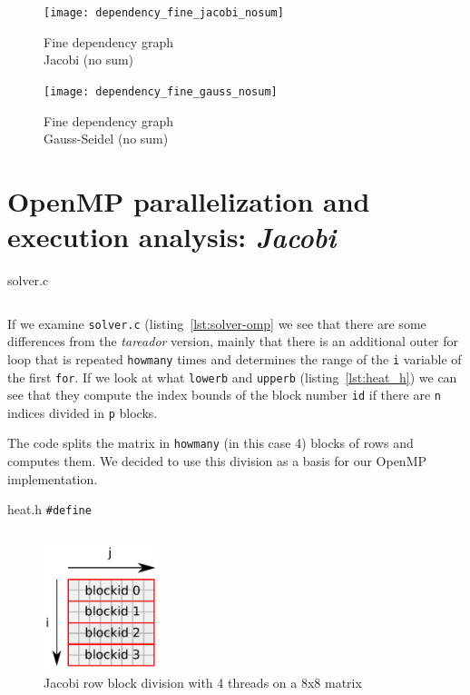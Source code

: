 \begin{figure}[H]
    \begin{minipage}{0.5\textwidth}
        \centering
        \texttt{[image: dependency\_fine\_jacobi\_nosum]}
        \caption{Fine dependency graph \\ Jacobi (no sum)}%
        \label{fig:dependency_fine_jacobi_nosum}
    \end{minipage}
    \begin{minipage}{0.5\textwidth}
        \centering
        \texttt{[image: dependency\_fine\_gauss\_nosum]}
        \caption{Fine dependency graph \\ Gauss-Seidel (no sum)}%
        \label{fig:dependency_fine_gauss_nosum}
    \end{minipage}
\end{figure}

\pagebreak
\section{OpenMP parallelization and execution analysis: \emph{Jacobi}}

\begin{listing}[H]
    \caption{solver.c}%
    \label{lst:solver-omp}
    \inputminted[firstline=17,lastline=39]{c}{code/solver-omp-orig.c}
\end{listing}

If we examine \texttt{solver.c} (listing~\ref{lst:solver-omp} we see that there are some differences 
from the \emph{tareador} version,
mainly that there is an additional outer for loop that is repeated \texttt{howmany} times and determines the
range of the \texttt{i} variable of the first \texttt{for}. If we look at what \texttt{lowerb} and
\texttt{upperb} (listing~\ref{lst:heat_h}) we can see that they compute the index bounds of the block
number \texttt{id} if there are \texttt{n} indices divided in \texttt{p} blocks.

The code splits the matrix in \texttt{howmany} (in this case 4) blocks of rows and computes them.
We decided to use this division as a basis for our OpenMP implementation.

\begin{listing}[H]
    \caption{heat.h \texttt{\#define}}%
    \label{lst:heat_h}
    \inputminted[firstline=59,lastline=61]{c}{code/heat.h}
\end{listing}


\begin{figure}[H]
    \centering
    \includegraphics[width=0.3\textwidth]{jacobi_blocks}
    \caption{Jacobi row block division with 4 threads on a 8x8 matrix}%
    \label{fig:blocks-jacobi}
\end{figure}

